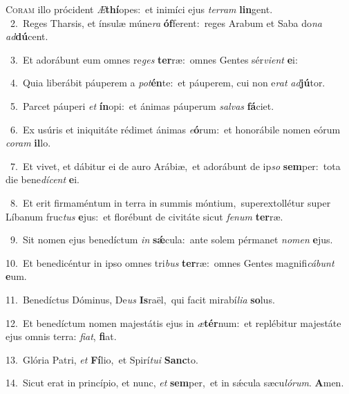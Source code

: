 \lettrine{\initial\textcolor{\initialcolor}{C}}{oram} illo prócident \textit{Æ}\-\textbf{thí}opes:~\star et inimíci ejus \textit{ter}\-\textit{ram} \textbf{lin}\-gent.\\
{\numbfont\textcolor{\numbcolor}{~2.}}~Reges Tharsis, et ínsulæ múne\textit{ra} \textbf{óf}\-ferent:~\star reges Arabum et Saba do\textit{na} \textit{ad}\-\textbf{dú}cent.\par
{\numbfont\textcolor{\numbcolor}{~3.}}~Et adorábunt eum omnes re\textit{ges} \textbf{ter}\-ræ:~\star omnes Gentes sér\-\textit{vi}\-\textit{ent} \textbf{e}\-i:\par
{\numbfont\textcolor{\numbcolor}{~4.}}~Quia liberábit páuperem a \textit{pot}\-\textbf{én}te:~\star et páuperem, cui non e\textit{rat} \textit{ad}\-\textbf{jú}tor.\par
{\numbfont\textcolor{\numbcolor}{~5.}}~Parcet páuperi \textit{et} \textbf{ín}\-opi:~\star et ánimas páuperum \textit{sal}\-\textit{vas} \textbf{fá}\-ciet.\par
{\numbfont\textcolor{\numbcolor}{~6.}}~Ex usúris et iniquitáte rédimet ánimas \textit{e}\-\textbf{ó}rum:~\star et honorábile nomen eórum \textit{co}\-\textit{ram} \textbf{il}\-lo.\par
{\numbfont\textcolor{\numbcolor}{~7.}}~Et vivet, et dábitur ei de auro Arábiæ,~\dagger et adorábunt de ip\textit{so} \textbf{sem}\-per:~\star tota die bene\-\textit{dí}\-\textit{cent} \textbf{e}\-i.\par
{\numbfont\textcolor{\numbcolor}{~8.}}~Et erit firmaméntum in terra in summis móntium,~\dagger superextollétur super Líbanum fruc\textit{tus} \textbf{e}\-jus:~\star et florébunt de civitáte sicut \textit{fe}\-\textit{num} \textbf{ter}\-ræ.\par
{\numbfont\textcolor{\numbcolor}{~9.}}~Sit nomen ejus benedíctum \textit{in} \textbf{sǽ}\-cula:~\star ante solem pérmanet \textit{no}\-\textit{men} \textbf{e}\-jus.\par
{\numbfont\textcolor{\numbcolor}{10.}}~Et benedicéntur in ipso omnes tri\textit{bus} \textbf{ter}\-ræ:~\star omnes Gentes magnifi\-\textit{cá}\-\textit{bunt} \textbf{e}\-um.\par
{\numbfont\textcolor{\numbcolor}{11.}}~Benedíctus Dóminus, De\textit{us} \textbf{Is}\-raël,~\star qui facit mirabí\-\textit{li}\-\textit{a} \textbf{so}\-lus.\par
{\numbfont\textcolor{\numbcolor}{12.}}~Et benedíctum nomen majestátis ejus in \textit{æ}\-\textbf{tér}num:~\star et replébitur majestáte ejus omnis terra: \textit{fi}\-\textit{at}, \textbf{fi}\-at.\par
{\numbfont\textcolor{\numbcolor}{13.}}~Glória Patri, \textit{et} \textbf{Fí}\-lio,~\star et Spirí\-\textit{tu}\-\textit{i} \textbf{Sanc}\-to.\par
{\numbfont\textcolor{\numbcolor}{14.}}~Sicut erat in princípio, et nunc, \textit{et} \textbf{sem}\-per,~\star et in sǽcula sæcu\-\textit{ló}\-\textit{rum}. \textbf{A}\-men.\par
